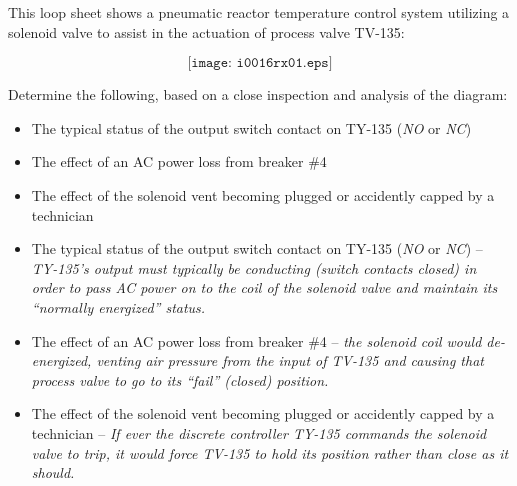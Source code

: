 

This loop sheet shows a pneumatic reactor temperature control system utilizing a solenoid valve to assist in the actuation of process valve TV-135:

$$\texttt{[image: i0016rx01.eps]}$$

Determine the following, based on a close inspection and analysis of the diagram:

\begin{itemize}
\item{} The typical status of the output switch contact on TY-135 ({\it NO} or {\it NC})
\vskip 10pt
\item{} The effect of an AC power loss from breaker \#4
\vskip 10pt
\item{} The effect of the solenoid vent becoming plugged or accidently capped by a technician
\end{itemize}







\begin{itemize}
\item{} The typical status of the output switch contact on TY-135 ({\it NO} or {\it NC}) -- {\it TY-135's output must typically be conducting (switch contacts closed) in order to pass AC power on to the coil of the solenoid valve and maintain its ``normally energized'' status.}
\vskip 10pt
\item{} The effect of an AC power loss from breaker \#4 -- {\it the solenoid coil would de-energized, venting air pressure from the input of TV-135 and causing that process valve to go to its ``fail'' (closed) position.}
\vskip 10pt
\item{} The effect of the solenoid vent becoming plugged or accidently capped by a technician -- {\it If ever the discrete controller TY-135 commands the solenoid valve to trip, it would force TV-135 to hold its position rather than close as it should.}
\end{itemize}











